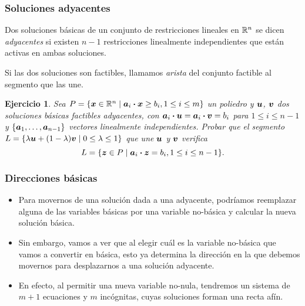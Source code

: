 \documentclass[aspectratio=169,12pt,spanish]{beamer}
\newtheorem{ejercicio}{Ejercicio}
\begin{document}

\begin{frame}
\frametitle{Soluciones adyacentes}

Dos soluciones básicas de un conjunto de restricciones lineales en $\mathbb{R}^n$ se dicen \emph{adyacentes} si existen $n-1$ restricciones linealmente independientes que están activas en ambas soluciones. 

Si las dos soluciones son factibles, llamamos \emph{arista} del conjunto factible al segmento que las une.

\begin{ejercicio}
Sea $P = \{\bm{x} \in \mathbb{R}^n \mid \bm{a}_i \boldsymbol{\cdot} \bm{x} \ge b_i,  1 \le i \le m\}$ un poliedro y $\bm{u}$, $\bm{v}$ dos soluciones básicas factibles adyacentes, con $\bm{a}_i \boldsymbol{\cdot} \bm{u} = \bm{a}_i \boldsymbol{\cdot} \bm{v} = b_i$ para $1 \le i \le n-1$ y $\{\bm{a}_1, \dots, \bm{a}_{n-1}\}$ vectores linealmente independientes.
Probar que el segmento $L = \{\lambda \bm{u} + (1-\lambda)\bm{v} \mid 0 \le \lambda \le 1\}$ que une $\bm{u}$ y $\bm{v}$ verifica
$$
L = \{\bm{z} \in P \mid \bm{a}_i \boldsymbol{\cdot} \bm{z} = b_i, 1\le i \le n-1\}.
$$
\end{ejercicio}


\end{frame}


\begin{frame}
\frametitle{Direcciones básicas}

\begin{itemize}
\item Para movernos de una solución dada a una adyacente, podríamos reemplazar alguna de las variables básicas por una variable no-básica y calcular la nueva solución básica. 
\item Sin embargo, vamos a ver que al elegir cuál es la variable no-básica que vamos a convertir en básica, esto ya determina la dirección en la que debemos movernos para desplazarnos a una solución adyacente. \pause
\item En efecto, al permitir una nueva variable no-nula, tendremos un sistema de $m+1$ ecuaciones y $m$ incógnitas, cuyas soluciones forman una recta afín.
\end{itemize}

\end{frame}

\end{document}
